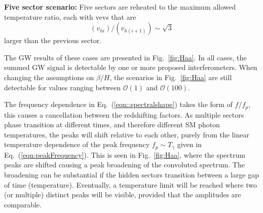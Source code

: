 \documentclass[nofootinbib,twocolumn,preprintnumbers]{revtex4-1}
\begin{document}
\textbf{Five sector scenario:} Five sectors are reheated to the maximum allowed temperature ratio, each with vevs that are 
\begin{equation}
 (v_{hi})/(v_{h(i+1)}) \sim \sqrt{3} 
\end{equation}
 larger than the previous sector.

The GW results of these cases are presented in Fig.~\ref{fig:Haa}. In all cases, the summed GW signal is detectable by one or more proposed interferometers. When changing the assumptions on $\beta/H$, the scenarios in Fig.~\ref{fig:Haa} are still detectable for values ranging between $\mathcal{O}(1)$ and $\mathcal{O}(100)$. 

The frequency dependence in Eq.~(\ref{eqn::spectralshape}) takes the form of $f/f_{p}$, this causes a cancellation between the redshifting factors. As multiple sectors phase transition at different times, and therefore different SM photon temperatures, the peaks will shift relative to each other, purely from the linear temperature dependence of the peak frequency $f_{p} \sim T_{\gamma}$ given in Eq.~(\ref{eqn:peakFrequency}).  This is seen in Fig.~\ref{fig:Haa}, where the spectrum peaks are shifted causing a peak broadening of the convoluted spectrum. The broadening can be substantial if the hidden sectors transition between a large gap of time (temperature). Eventually, a temperature limit will be reached where two (or multiple) distinct peaks will be visible, provided that the amplitudes are comparable. 
\end{document}
